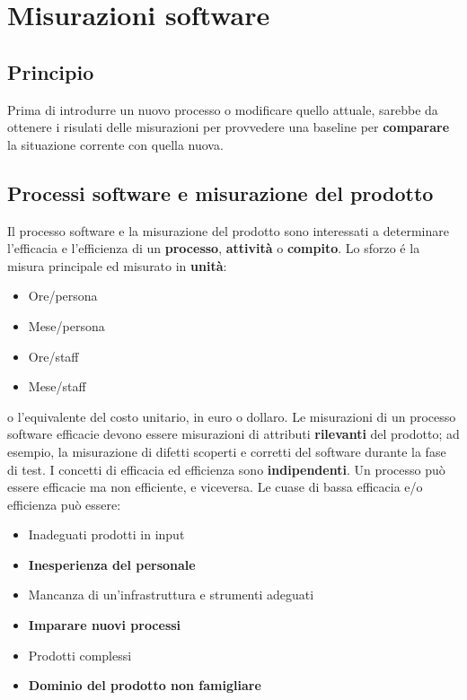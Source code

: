 \chapter{Misurazioni software}
\section{Principio}
Prima di introdurre un nuovo processo o modificare quello attuale, sarebbe da ottenere i risulati delle misurazioni per provvedere una \gls{baseline} per \textbf{comparare} la situazione corrente con quella nuova.

\section{Processi software e misurazione del prodotto}
Il processo software e la misurazione del prodotto sono interessati a determinare l'\gls{efficacia} e l'\gls{efficienza} di un \textbf{processo}, \textbf{attivit\`a} o \textbf{compito}. \newline
Lo sforzo \'e la misura principale ed misurato in \textbf{unit\`a}:
\begin{itemize}
\item Ore/persona
\item Mese/persona
\item Ore/staff
\item Mese/staff
\end{itemize}
o l'equivalente del costo unitario, in euro o dollaro. \newline
Le misurazioni di un processo software efficacie devono essere misurazioni di attributi \textbf{rilevanti} del prodotto; ad esempio, la misurazione di difetti scoperti e corretti del software durante la fase di test. \newline
I concetti di efficacia ed efficienza sono \textbf{indipendenti}. Un processo pu\`o essere efficacie ma non efficiente, e viceversa. Le cuase di bassa efficacia e/o efficienza pu\`o essere:
\begin{itemize}
\item Inadeguati prodotti in input
\item \textbf{Inesperienza del personale}
\item Mancanza di un'infrastruttura e strumenti adeguati
\item \textbf{Imparare nuovi processi}
\item Prodotti complessi
\item \textbf{Dominio del prodotto non famigliare}
\end{itemize}

